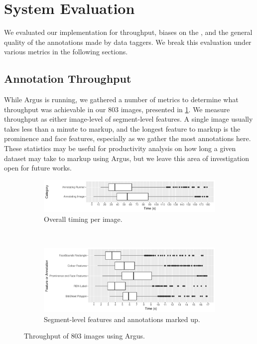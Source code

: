 \section{System Evaluation}

We evaluated our implementation for throughput, biases on the , and the general quality of the annotations made by data taggers. We break this evaluation under various metrics in the following sections.

\subsection{Annotation Throughput}
\label{sec:dataset:argus:metrics}

While Argus is running, we gathered a number of metrics to determine what throughput was achievable in our 803 images, presented in  \cref{fig:dataset:argus:metrics:throughput}. We measure throughput as either image-level of segment-level features. A single image usually takes less than a minute to markup, and the longest feature to markup is the prominence and face features, especially as we gather the most annotations here. These statistics may be useful for productivity analysis on how long a given dataset may take to markup using Argus, but we leave this area of investigation open for future works.

\begin{figure}[h]
  \begin{subfigure}[b]{\textwidth}
    \includegraphics[width=\textwidth]{images/dataset/argus/photo_box_plots}
    \caption{Overall timing per image.}   
  \end{subfigure}
  \smallskip
  \\
  \begin{subfigure}[b]{\textwidth}
    \includegraphics[width=\textwidth]{images/dataset/argus/feature_box_plots}
    \caption{Segment-level features and annotations marked up.}   
  \end{subfigure}
  \caption[Throughput of images using Argus]{Throughput of 803 images using Argus.}
  \label{fig:dataset:argus:metrics:throughput}
\end{figure}

